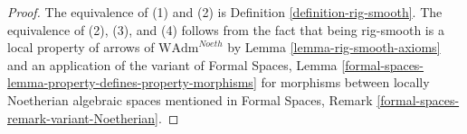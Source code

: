 \documentclass[10pt,a4paper]{amsart}
\theoremstyle{plain}
\theoremstyle{definition}
\theoremstyle{remark}
\numberwithin{equation}{subsection}
\begin{document}
\begin{proof}
The equivalence of (1) and (2) is Definition \ref{definition-rig-smooth}.
The equivalence of (2), (3), and (4) follows from the fact that
being rig-smooth is a local property of arrows of
$\text{WAdm}^{Noeth}$ by Lemma \ref{lemma-rig-smooth-axioms}
and an application of the variant of
Formal Spaces, Lemma
\ref{formal-spaces-lemma-property-defines-property-morphisms}
for morphisms between locally Noetherian algebraic spaces
mentioned in
Formal Spaces, Remark
\ref{formal-spaces-remark-variant-Noetherian}.
\end{proof}
\end{document}
